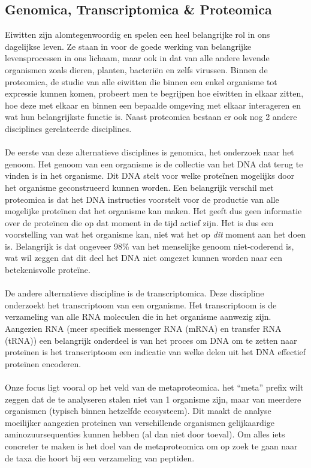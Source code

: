 \documentclass[11pt,dutch,faculty=we,layout=titlefont,underline=false,titleUppercase=true,titleUnderline=true]{ugent2016-report}
\begin{document}
    \subsection{Genomica, Transcriptomica \& Proteomica}\label{subsec:genomica-transcriptomica-&-proteomica}
    Eiwitten zijn alomtegenwoordig en spelen een heel belangrijke rol in ons dagelijkse leven.
    Ze staan in voor de goede werking van belangrijke levensprocessen in ons lichaam, maar ook in dat van alle andere levende organismen zoals dieren, planten, bacteriën en zelfs virussen.
    Binnen de proteomica, de studie van alle eiwitten die binnen een enkel organisme tot expressie kunnen komen, probeert men te begrijpen hoe eiwitten in elkaar zitten, hoe deze met elkaar en binnen een bepaalde omgeving met elkaar interageren en wat hun belangrijkste functie is.
    Naast proteomica bestaan er ook nog 2 andere disciplines gerelateerde disciplines.
    \\ \\
    De eerste van deze alternatieve disciplines is genomica, het onderzoek naar het genoom.
    Het genoom van een organisme is de collectie van het DNA dat terug te vinden is in het organisme.
    Dit DNA stelt voor welke proteïnen mogelijks door het organisme geconstrueerd kunnen worden.
    Een belangrijk verschil met proteomica is dat het DNA instructies voorstelt voor de productie van alle mogelijke proteïnen dat het organisme kan maken.
    Het geeft dus geen informatie over de proteïnen die op dat moment in de tijd actief zijn.
    Het is dus een voorstelling van wat het organisme kan, niet wat het op \textit{dit} moment aan het doen is.
    Belangrijk is dat ongeveer 98\% van het menselijke genoom niet-coderend is, wat wil zeggen dat dit deel het DNA niet omgezet kunnen worden naar een betekenisvolle proteïne.
    \\ \\
    De andere alternatieve discipline is de transcriptomica.
    Deze discipline onderzoekt het transcriptoom van een organisme.
    Het transcriptoom is de verzameling van alle RNA moleculen die in het organisme aanwezig zijn.
    Aangezien RNA (meer specifiek messenger RNA (mRNA) en transfer RNA (tRNA)) een belangrijk onderdeel is van het proces om DNA om te zetten naar proteïnen is het transcriptoom een indicatie van welke delen uit het DNA effectief proteïnen encoderen.
    \\ \\
    Onze focus ligt vooral op het veld van de metaproteomica.
    het ``meta'' prefix wilt zeggen dat de te analyseren stalen niet van 1 organisme zijn, maar van meerdere organismen (typisch binnen hetzelfde ecosysteem).
    Dit maakt de analyse moeilijker aangezien proteïnen van verschillende organismen gelijkaardige aminozuursequenties kunnen hebben (al dan niet door toeval).
    Om alles iets concreter te maken is het doel van de metaproteomica om op zoek te gaan naar de taxa die hoort bij een verzameling van peptiden.
\end{document}
